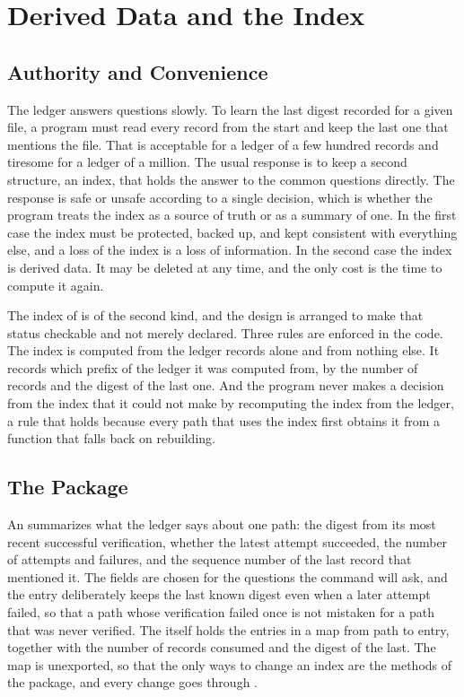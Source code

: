 \chapter{Derived Data and the Index}
\label{ch:index}

\section{Authority and Convenience}

The ledger answers questions slowly. To learn the last digest recorded for a given file, a program must read every record from the start and keep the last one that mentions the file. That is acceptable for a ledger of a few hundred records and tiresome for a ledger of a million. The usual response is to keep a second structure, an index, that holds the answer to the common questions directly. The response is safe or unsafe according to a single decision, which is whether the program treats the index as a source of truth or as a summary of one. In the first case the index must be protected, backed up, and kept consistent with everything else, and a loss of the index is a loss of information. In the second case the index is derived data. It may be deleted at any time, and the only cost is the time to compute it again.

The index of \golab{} is of the second kind, and the design is arranged to make that status checkable and not merely declared. Three rules are enforced in the code. The index is computed from the ledger records alone and from nothing else. It records which prefix of the ledger it was computed from, by the number of records and the digest of the last one. And the program never makes a decision from the index that it could not make by recomputing the index from the ledger, a rule that holds because every path that uses the index first obtains it from a function that falls back on rebuilding.

\section{The Package}


An  summarizes what the ledger says about one path: the digest from its most recent successful verification, whether the latest attempt succeeded, the number of attempts and failures, and the sequence number of the last record that mentioned it. The fields are chosen for the questions the command will ask, and the entry deliberately keeps the last known digest even when a later attempt failed, so that a path whose verification failed once is not mistaken for a path that was never verified. The  itself holds the entries in a map from path to entry, together with the number of records consumed and the digest of the last. The map is unexported, so that the only ways to change an index are the methods of the package, and every change goes through .

